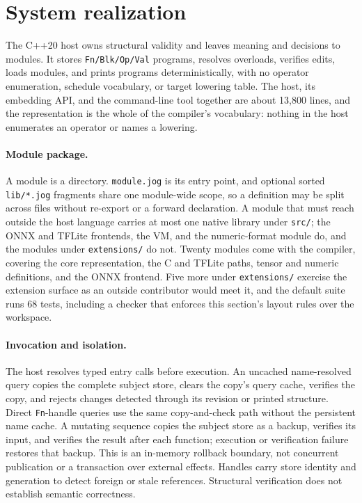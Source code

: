 \documentclass[sigplan,anonymous,review]{acmart}
\begin{document}
\section{System realization}
The C++20 host owns structural validity and leaves meaning and decisions to
modules. It stores \texttt{Fn/Blk/Op/Val} programs, resolves overloads, verifies
edits, loads modules, and prints programs deterministically, with no operator
enumeration, schedule vocabulary, or target lowering table. The host, its
embedding API, and the command-line tool together are about 13{,}800 lines, and
the representation is the whole of the compiler's vocabulary: nothing in the
host enumerates an operator or names a lowering.

\paragraph{Module package.}
A module is a directory. \texttt{module.jog} is its entry point, and optional
sorted \texttt{lib/*.jog} fragments share one module-wide scope, so a definition
may be split across files without re-export or a forward declaration. A module
that must reach outside the host language carries at most one native library
under \texttt{src/}; the ONNX and TFLite frontends, the VM, and the
numeric-format module do, and the modules under \texttt{extensions/} do not. Twenty modules come with the compiler, covering the core
representation, the C and TFLite paths, tensor and numeric definitions, and the
ONNX frontend. Five more under \texttt{extensions/} exercise the extension
surface as an outside contributor would meet it, and the default suite runs 68
tests, including a checker that enforces this section's layout rules over the
workspace.

\paragraph{Invocation and isolation.}
The host resolves typed entry calls before execution. An uncached name-resolved
query copies the complete subject store, clears the copy's query cache,
verifies the copy, and rejects changes detected through its revision or printed
structure. Direct \texttt{Fn}-handle queries use the same copy-and-check path
without the persistent name cache. A mutating sequence copies the subject store
as a backup, verifies its input, and verifies the result after each function;
execution or verification failure restores that backup. This is an in-memory
rollback boundary, not concurrent publication or a transaction over external
effects. Handles carry store identity and generation to detect foreign or stale
references. Structural verification does not establish semantic correctness.
\end{document}
